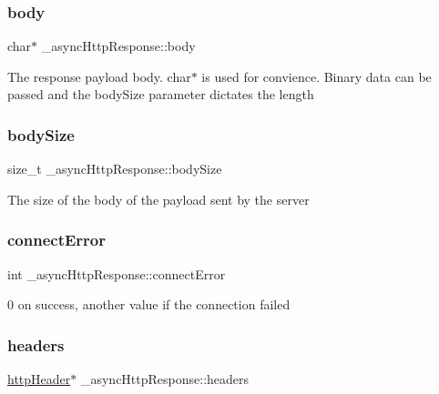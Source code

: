 \subsubsection{\texorpdfstring{body}{body}}
{\footnotesize\ttfamily char$\ast$ \+\_\+async\+Http\+Response\+::body}

The response payload body. char$\ast$ is used for convience. Binary data can be passed and the body\+Size parameter dictates the length \mbox{\label{struct__asyncHttpResponse_a25cf7e4fe3454983f74d12cb12c92960}} 
\subsubsection{\texorpdfstring{body\+Size}{bodySize}}
{\footnotesize\ttfamily size\+\_\+t \+\_\+async\+Http\+Response\+::body\+Size}

The size of the body of the payload sent by the server \mbox{\label{struct__asyncHttpResponse_a0f9394289504da22db846788a19ccf66}} 
\subsubsection{\texorpdfstring{connect\+Error}{connectError}}
{\footnotesize\ttfamily int \+\_\+async\+Http\+Response\+::connect\+Error}

0 on success, another value if the connection failed \mbox{\label{struct__asyncHttpResponse_a1de52b16a28ada8e4b25f22a09a37212}} 
\subsubsection{\texorpdfstring{headers}{headers}}
{\footnotesize\ttfamily \hyperlink{redfishRawAsync_8h_a3ee36950587f4749a62b080e3e157280}{http\+Header}$\ast$ \+\_\+async\+Http\+Response\+::headers}

